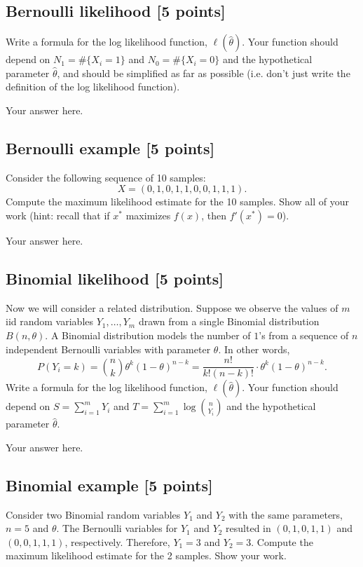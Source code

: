 \documentclass[a4paper]{article}
\theoremstyle{definition}
\begin{document}
\subsection{Bernoulli likelihood [5 points]}
	Write a formula for the log likelihood function, $\ell(\hat \theta)$.  
	Your function should depend on $N_1 = \#\{X_i= 1\}$ and $N_0 = \#\{X_i = 0\}$ and the hypothetical parameter $\hat \theta$, and should be simplified as far as possible (i.e. don't just write the definition of the log likelihood function). 
	
	{\color{blue} Your answer here.}
	
	
\subsection{Bernoulli example [5 points]}
	Consider the following sequence of 10 samples:
	\[
	X = (0 , 1, 0, 1, 1, 0, 0, 1, 1, 1).
	\]
	Compute the maximum likelihood estimate for the 10 samples. 
	Show all of your work (hint: recall that if $x^*$ maximizes $f(x)$, then $f'(x^*) = 0$). 
	
	{\color{blue} Your answer here.}
	
	
\subsection{Binomial likelihood [5 points]}
	Now we will consider a related distribution. 
	Suppose we observe the values of $m$ iid random variables $Y_1,\dots,Y_m$ drawn from a single Binomial distribution $B(n,\theta)$. 
	A Binomial distribution models the number of $1$'s from a sequence of $n$ independent Bernoulli variables with parameter $\theta$. 
	In other words,
	\[
	P(Y_i = k) = {n \choose k}\theta^k (1-\theta)^{n-k} = \frac{n!}{k!(n-k)!}\cdot\theta^k (1-\theta)^{n-k}.
	\]
	Write a formula for the log likelihood function, $\ell(\hat \theta)$.  
	Your function should depend on $S=\sum_{i=1}^mY_i$ and $T=\sum_{i=1}^m\log\binom{n}{Y_i}$ and the hypothetical parameter $\hat \theta$.
	
	{\color{blue} Your answer here.}
	
	
\subsection{Binomial example [5 points]}
	Consider two Binomial random variables $Y_1$ and $Y_2$ with the same parameters, $n=5$ and $\theta$.
	The Bernoulli variables for $Y_1$ and $Y_2$ resulted in $(0,1,0,1,1)$ and $(0,0,1,1,1)$, respectively. 
	Therefore, $Y_1=3$ and $Y_2=3$. 
	Compute the maximum likelihood estimate for the 2 samples. 
	Show your work.
	
\end{document}
